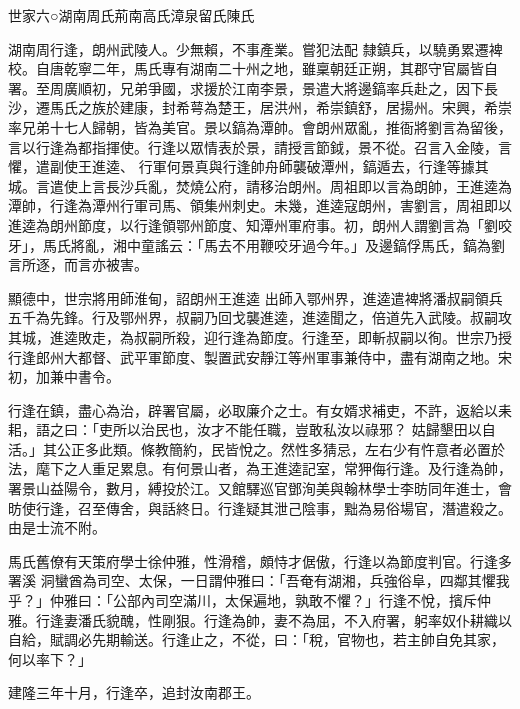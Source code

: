 
\begin{pinyinscope}

 世家六○湖南周氏荊南高氏漳泉留氏陳氏



 湖南周行逢，朗州武陵人。少無賴，不事產業。嘗犯法配
 隸鎮兵，以驍勇累遷裨校。自唐乾寧二年，馬氏專有湖南二十州之地，雖稟朝廷正朔，其郡守官屬皆自署。至周廣順初，兄弟爭國，求援於江南李景，景遣大將邊鎬率兵赴之，因下長沙，遷馬氏之族於建康，封希萼為楚王，居洪州，希崇鎮舒，居揚州。宋興，希崇率兄弟十七人歸朝，皆為美官。景以鎬為潭帥。會朗州眾亂，推衙將劉言為留後，言以行逢為都指揮使。行逢以眾情表於景，請授言節鉞，景不從。召言入金陵，言懼，遣副使王進逵、
 行軍何景真與行逢帥舟師襲破潭州，鎬遁去，行逢等據其城。言遣使上言長沙兵亂，焚燒公府，請移治朗州。周祖即以言為朗帥，王進逵為潭帥，行逢為潭州行軍司馬、領集州刺史。未幾，進逵寇朗州，害劉言，周祖即以進逵為朗州節度，以行逢領鄂州節度、知潭州軍府事。初，朗州人謂劉言為「劉咬牙」，馬氏將亂，湘中童謠云：「馬去不用鞭咬牙過今年。」及邊鎬俘馬氏，鎬為劉言所逐，而言亦被害。



 顯德中，世宗將用師淮甸，詔朗州王進逵
 出師入鄂州界，進逵遣裨將潘叔嗣領兵五千為先鋒。行及鄂州界，叔嗣乃回戈襲進逵，進逵聞之，倍道先入武陵。叔嗣攻其城，進逵敗走，為叔嗣所殺，迎行逢為節度。行逢至，即斬叔嗣以徇。世宗乃授行逢郎州大都督、武平軍節度、製置武安靜江等州軍事兼侍中，盡有湖南之地。宋初，加兼中書令。



 行逢在鎮，盡心為治，辟署官屬，必取廉介之士。有女婿求補吏，不許，返給以耒耜，語之曰：「吏所以治民也，汝才不能任職，豈敢私汝以祿邪？
 姑歸墾田以自活。」其公正多此類。條教簡約，民皆悅之。然性多猜忌，左右少有忤意者必置於法，麾下之人重足累息。有何景山者，為王進逵記室，常狎侮行逢。及行逢為帥，署景山益陽令，數月，縛投於江。又館驛巡官鄧洵美與翰林學士李昉同年進士，會昉使行逢，召至傳舍，與話終日。行逢疑其泄己陰事，黜為易俗場官，潛遣殺之。由是士流不附。



 馬氏舊僚有天策府學士徐仲雅，性滑稽，頗恃才倨傲，行逢以為節度判官。行逢多署溪
 洞蠻酋為司空、太保，一日謂仲雅曰：「吾奄有湖湘，兵強俗阜，四鄰其懼我乎？」仲雅曰：「公部內司空滿川，太保遍地，孰敢不懼？」行逢不悅，擯斥仲雅。行逢妻潘氏貌醜，性剛狠。行逢為帥，妻不為屈，不入府署，躬率奴仆耕織以自給，賦調必先期輸送。行逢止之，不從，曰：「稅，官物也，若主帥自免其家，何以率下？」



 建隆三年十月，行逢卒，追封汝南郡王。




\end{pinyinscope}
